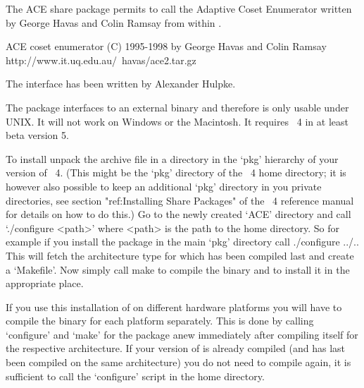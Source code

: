 

The ACE share package permits to call the Adaptive Coset Enumerator written
by George Havas and Colin Ramsay from within {\GAP}. 

\begintt
ACE coset enumerator (C) 1995-1998 by George Havas and Colin Ramsay
    http://www.it.uq.edu.au/~havas/ace2.tar.gz
\endtt

The {\GAP} interface has been written by Alexander Hulpke.

The package interfaces to an external binary and therefore is only usable
under UNIX. It will not work on Windows or the Macintosh. It requires
{\GAP}~4 in at least beta version 5.


To install unpack the archive file in a directory in the `pkg' hierarchy of
your version of {\GAP}~4. (This might be the `pkg' directory of the
{\GAP}~4 home directory; it is however also possible to keep an additional
`pkg' directory in you private directories, see section "ref:Installing
Share Packages" of the {\GAP}~4 reference manual for details on how to do
this.) Go to the newly created `ACE' directory and call `./configure <path>'
where <path> is the path to the {\GAP} home directory. So for example if you
install the package in the main `pkg' directory call
\begintt
./configure ../..
\endtt
This will fetch the architecture type for which {\GAP} has been compiled last
and create a `Makefile'. 
Now simply call
\begintt
make
\endtt
to compile the binary and to install it in the appropriate place.

If you use this installation of {\GAP} on different hardware platforms you will
have to compile the binary for each platform separately. This is done by
calling `configure' and `make' for the package anew immediately after
compiling {\GAP} itself for the respective architecture.
If your version of {\GAP} is already compiled (and has last been compiled on
the same architecture) you do not need to compile {\GAP}
again, it is sufficient to call the `configure' script in the {\GAP} home
directory.

